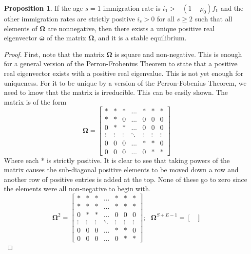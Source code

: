 \documentclass[letterpaper,12pt]{article}
\theoremstyle{definition}
\newtheorem{proposition}{Proposition} %
\begin{document}
    \begin{proposition}
      If the age $s=1$ immigration rate is $i_1>-(1-\rho_0)f_1$ and the other immigration rates are strictly positive $i_s>0$ for all $s\geq 2$ such that all elements of $\bm{\Omega}$ are nonnegative, then there exists a unique positive real eigenvector $\bm{\bar{\omega}}$ of the matrix $\bm{\Omega}$, and it is a stable equilibrium.
    \end{proposition}

    \begin{proof}
      First, note that the matrix $\bm{\Omega}$ is square and non-negative.  This is enough for a general version of the Perron-Frobenius Theorem to state that a positive real eigenvector exists with a positive real eigenvalue. This is not yet enough for uniqueness. For it to be unique by a version of the Perron-Fobenius Theorem, we need to know that the matrix is irreducible. This can be easily shown. The matrix is of the form
      $$\bm{\Omega} =
      \begin{bmatrix}
        * & *  & * & \hdots & * & * & *\\
        * & * & 0 & \hdots & 0 & 0 & 0 \\
        0 & * & * & \hdots & 0 & 0 & 0 \\
        \vdots & \vdots & \vdots & \ddots & \vdots & \vdots & \vdots \\
        0 & 0 & 0 & \hdots & *  & * & 0 \\
        0 & 0 & 0 & \hdots & 0 & * & *
      \end{bmatrix}
      $$
      Where each * is strictly positive. It is clear to see that taking powers of the matrix causes the sub-diagonal positive elements to be moved down a row and another row of positive entries is added at the top. None of these go to zero since the elements were all non-negative to begin with.
      $$\bm{\Omega}^2 =
      \begin{bmatrix}
        * & *  & * & \hdots & * & * & *\\
        * & * & * & \hdots & * & * & * \\
        0 & * & * & \hdots & 0 & 0 & 0 \\
        \vdots & \vdots & \vdots & \ddots & \vdots & \vdots & \vdots \\
        0 & 0 & 0 & \hdots & *  & * & 0 \\
        0 & 0 & 0 & \hdots & 0 & * & *
      \end{bmatrix}; ~~~
      \bm{\Omega}^{S+E-1} =
      \begin{bmatrix}

\end{bmatrix}$$
\end{proof}
\end{document}
